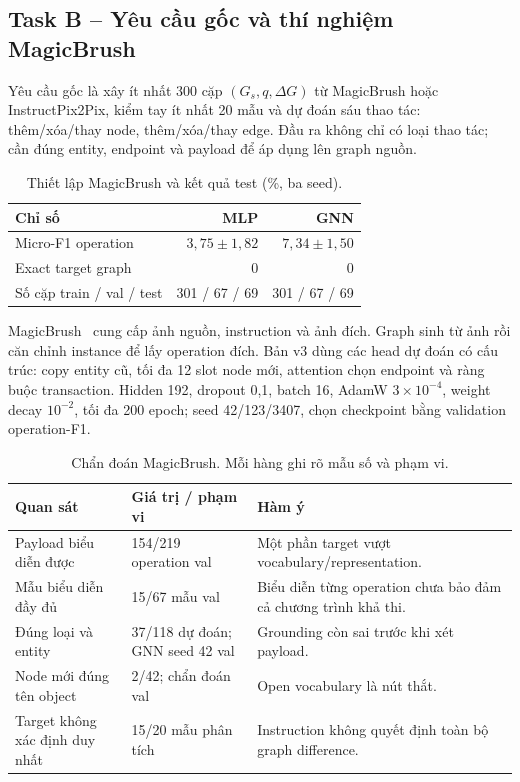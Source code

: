 \clearpage
\subsection{Task B -- Yêu cầu gốc và thí nghiệm MagicBrush}
Yêu cầu gốc là xây ít nhất 300 cặp $(G_s,q,\Delta G)$ từ MagicBrush hoặc
InstructPix2Pix, kiểm tay ít nhất 20 mẫu và dự đoán sáu thao tác:
thêm/xóa/thay node, thêm/xóa/thay edge. Đầu ra không chỉ có loại thao tác;
cần đúng entity, endpoint và payload để áp dụng lên graph nguồn.

\begin{table}[H]\centering\small
\caption{Thiết lập MagicBrush và kết quả test (\%, ba seed).}\label{tab:magic}
\begin{tabularx}{\linewidth}{@{}Xrr@{}}\toprule
Chỉ số & MLP & GNN\\\midrule
Micro-F1 operation & $3,75\pm1,82$ & $7,34\pm1,50$\\
Exact target graph & 0 & 0\\
Số cặp train / val / test & 301 / 67 / 69 & 301 / 67 / 69\\
\bottomrule\end{tabularx}\end{table}

MagicBrush~\cite{zhang2023magicbrush} cung cấp ảnh nguồn, instruction và ảnh đích.
Graph sinh từ ảnh rồi căn chỉnh instance để lấy operation đích.
Bản v3 dùng các head dự đoán có cấu trúc: copy entity cũ, tối đa 12 slot node mới,
attention chọn endpoint và ràng buộc transaction. Hidden 192, dropout 0,1,
batch 16, AdamW $3\times10^{-4}$, weight decay $10^{-2}$, tối đa 200 epoch;
seed 42/123/3407, chọn checkpoint bằng validation operation-F1.

\begin{table}[H]\centering\small
\caption{Chẩn đoán MagicBrush. Mỗi hàng ghi rõ mẫu số và phạm vi.}\label{tab:magicdiag}
\begin{tabularx}{\linewidth}{@{}p{49mm}p{28mm}X@{}}\toprule
Quan sát & Giá trị / phạm vi & Hàm ý\\\midrule
Payload biểu diễn được & 154/219 operation val & Một phần target vượt vocabulary/representation.\\
Mẫu biểu diễn đầy đủ & 15/67 mẫu val & Biểu diễn từng operation chưa bảo đảm cả chương trình khả thi.\\
Đúng loại và entity & 37/118 dự đoán; GNN seed 42 val & Grounding còn sai trước khi xét payload.\\
Node mới đúng tên object & 2/42; chẩn đoán val & Open vocabulary là nút thắt.\\
Target không xác định duy nhất & 15/20 mẫu phân tích & Instruction không quyết định toàn bộ graph difference.\\
\bottomrule\end{tabularx}\end{table}

